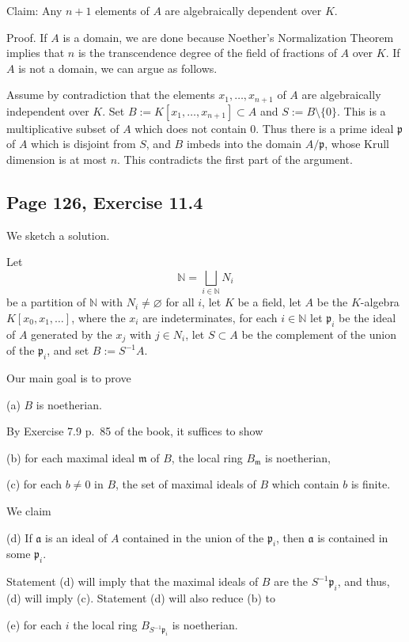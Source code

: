 \documentclass[parskip=half,fontsize=12pt]{scrartcl}%
\newcommand{\mf}{\mathfrak}
\newcommand{\aaa}{\mf a}
\newcommand{\mmm}{\mf m}
\newcommand{\ppp}{\mf p}
\begin{document}
Claim: Any $n+1$ elements of $A$ are algebraically dependent over $K$.

Proof. If $A$ is a domain, we are done because Noether's Normalization Theorem implies that $n$ is the transcendence degree of the field of fractions of $A$ over $K$. If $A$ is not a domain, we can argue as follows. 

Assume by contradiction that the elements $x_1,\ldots,x_{n+1}$ of $A$ are algebraically independent over $K$. Set $B:=K[x_1,\ldots,x_{n+1}]\subset A$ and $S:=B\setminus\{0\}$. This is a multiplicative subset of $A$ which does not contain $0$. Thus there is a prime ideal $\ppp$ of $A$ which is disjoint from $S$, and $B$ imbeds into the domain $A/\ppp$, whose Krull dimension is at most $n$. This contradicts the first part of the argument. 

\subsection{Page 126, Exercise 11.4}%

We sketch a solution. 

Let 
$$
\mathbb N=\bigsqcup_{i\in\mathbb N}N_i
$$ 
be a partition of $\mathbb N$ with $N_i\ne\varnothing$ for all $i$, let $K$ be a field, let $A$ be the $K$-algebra $K[x_0,x_1,\dots]$, where the $x_i$ are indeterminates, for each $i\in\mathbb N$ let $\ppp_i$ be the ideal of $A$ generated by the $x_j$ with $j\in N_i$, let $S\subset A$ be the complement of the union of the $\ppp_i$, and set $B:=S^{-1}A$. 

Our main goal is to prove 

(a) $B$ is noetherian. 

By Exercise 7.9 p.~85 of the book, it suffices to show 

(b) for each maximal ideal $\mmm$ of $B$, the local ring $B_\mmm$ is noetherian,

(c) for each $b\ne0$ in $B$, the set of maximal ideals of $B$ which contain $b$ is
finite.

We claim 

(d) If $\aaa$ is an ideal of $A$ contained in the union of the $\ppp_i$, then $\aaa$ is contained in some $\ppp_i$. %

Statement (d) will imply that the maximal ideals of $B$ are the $S^{-1}\ppp_i$, and thus, (d) will imply (c). Statement (d) will also reduce (b) to 

(e) for each $i$ the local ring $B_{S^{-1}\ppp_i}$ is noetherian. 
\end{document}

